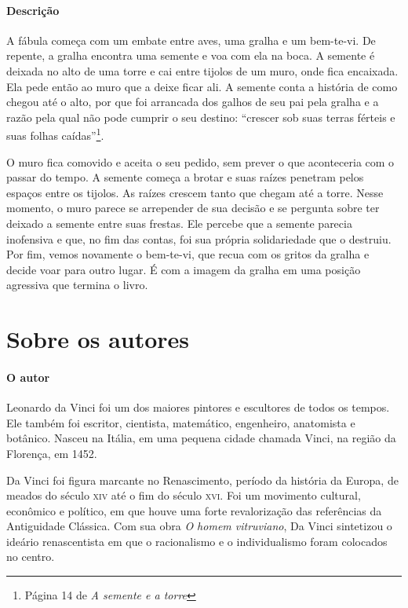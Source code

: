 \documentclass[11pt]{extarticle}
\begin{document}
\paragraph{Descrição} A fábula começa com um embate entre aves, uma gralha e um bem-te-vi. De repente, a gralha encontra uma semente e voa com ela na boca. A semente é deixada no alto de uma torre e cai entre tijolos de um muro, onde fica encaixada. Ela pede então ao muro que a deixe ficar ali. A semente conta a história de como chegou até o alto, por que foi arrancada dos galhos de seu pai pela gralha e a razão pela qual não pode cumprir o seu destino: ``crescer sob suas terras férteis e suas folhas caídas''\footnote{Página 14 de \textit{A semente e a torre}}. 

O muro fica comovido e aceita o seu pedido, sem prever o que aconteceria com o passar do tempo. A semente começa a brotar e suas raízes penetram pelos espaços entre os tijolos. As raízes crescem tanto que chegam até a torre. Nesse momento, o muro parece se arrepender de sua decisão e se pergunta sobre ter deixado a semente entre suas frestas. Ele percebe que a semente parecia inofensiva e que, no fim das contas, foi sua própria solidariedade que o destruiu. Por fim, vemos novamente o bem-te-vi, que recua com os gritos da gralha e decide voar para outro lugar. É com a imagem da gralha em uma posição agressiva que termina o livro.

\section{Sobre os autores}


\paragraph{O autor} Leonardo da Vinci foi um dos maiores pintores e escultores de todos os tempos. Ele também foi escritor, cientista, matemático, engenheiro, anatomista e botânico. Nasceu na Itália, em uma pequena cidade chamada Vinci, na região da Florença, em 1452.

Da Vinci foi figura marcante no Renascimento, período da história da Europa, de meados do século \textsc{xiv} até o fim do século  \textsc{xvi}. Foi um movimento cultural, econômico e político, em que houve uma forte revalorização das referências da Antiguidade Clássica. Com sua obra \textit{O homem vitruviano}, Da Vinci sintetizou o ideário renascentista em que o racionalismo e o individualismo foram colocados no centro.
\end{document}
